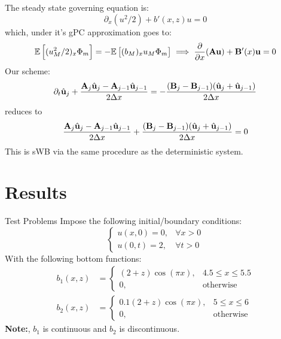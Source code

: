 \documentclass[
    pdf,
    11pt,
    xcolor={svgnames},
  ]{beamer}
\begin{document}
\begin{frame}
   The steady state governing equation is:
   \[
   \partial_x ( u^2/2 ) + b'(x,z) u = 0
   \]
   which, under it's gPC approximation goes to:
   \[
   \mathbb{E}\left[
        ( u_M^2/2 )_x \Phi_m
   \right]
   = - \mathbb{E}\left[
        ( b_M )_x u_M \Phi_m
   \right]
   \implies
   \pdv{}{x} \/ (\vb{A} \vb{u}) + \vb{B}'(x) \vb{u} = 0
   \]
   \pause
    Our scheme:
   \begin{equation*}
       \partial_t \hat{\vb{u}}_j + \frac{\vb{A}_j \hat{\vb{u}}_j - \vb{A}_{j-1} \hat{\vb{u}}_{j-1}}{2\Delta x} = -\frac{(\vb{B}_j - \vb{B}_{j-1})(\hat{\vb{u}}_j + \hat{\vb{u}}_{j-1})}{2\Delta x}
   \end{equation*} 
   reduces to
   \begin{equation*}
       \frac{\vb{A}_j \hat{\vb{u}}_j - \vb{A}_{j-1} \hat{\vb{u}}_{j-1}}{2\Delta x} + \frac{(\vb{B}_j - \vb{B}_{j-1})(\hat{\vb{u}}_j + \hat{\vb{u}}_{j-1})}{2\Delta x} = 0
   \end{equation*} 
   This is sWB via the same procedure as the deterministic system.
\end{frame}


\section{Results}

\begin{frame}{Test Problems}
    Impose the following initial/boundary conditions:
    \[
    \begin{cases}
        u(x,0) = 0, &\forall x > 0 \\
        u(0,t) = 2, &\forall t > 0
    \end{cases}
    \]
    With the following bottom functions:
    \begin{align*}
        b_1(x,z)
        &=
        \begin{cases}
            (2+z) \cos(\pi x), & 4.5 \leq x \leq 5.5 \\
            0, & \text{otherwise}
        \end{cases} \\
        b_2(x,z)
        &=
        \begin{cases}
            0.1(2+z) \cos(\pi x), & 5 \leq x \leq 6 \\
            0, & \text{otherwise}
        \end{cases}
    \end{align*}
    {\bf Note:}, $b_1$ is continuous and $b_2$ is discontinuous.
\end{frame}
\end{document}
